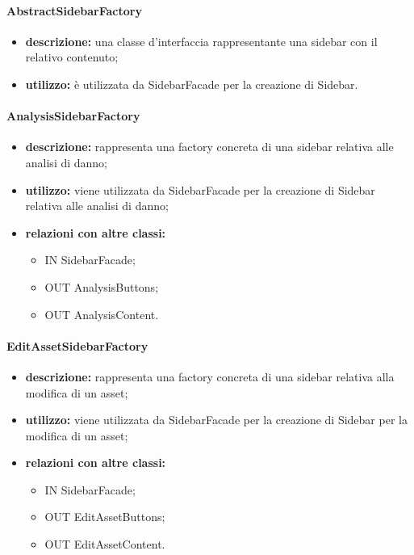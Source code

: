 \paragraph{AbstractSidebarFactory}
\begin{itemize}
	\item \textbf{descrizione:} una classe d'interfaccia rappresentante una sidebar con il relativo contenuto;
	\item \textbf{utilizzo:} è utilizzata da SidebarFacade per la creazione di Sidebar.
\end{itemize}
\paragraph{AnalysisSidebarFactory}
\begin{itemize}
	\item \textbf{descrizione:} rappresenta una factory concreta di una sidebar relativa alle analisi di danno;
	\item \textbf{utilizzo:} viene utilizzata da SidebarFacade per la creazione di Sidebar relativa alle analisi di danno;
	\item \textbf{relazioni con altre classi:} 
	\begin{itemize}
		\item IN SidebarFacade;
		\item OUT AnalysisButtons;
		\item OUT AnalysisContent.
	\end{itemize}
\end{itemize}
\paragraph{EditAssetSidebarFactory}
\begin{itemize}
	\item \textbf{descrizione:} rappresenta una factory concreta di una sidebar relativa alla modifica di un asset;
	\item \textbf{utilizzo:} viene utilizzata da SidebarFacade per la creazione di Sidebar per la modifica di un asset;
	\item \textbf{relazioni con altre classi:} 
	\begin{itemize}
		\item IN SidebarFacade;
		\item OUT EditAssetButtons;
		\item OUT EditAssetContent.
	\end{itemize}
\end{itemize}
